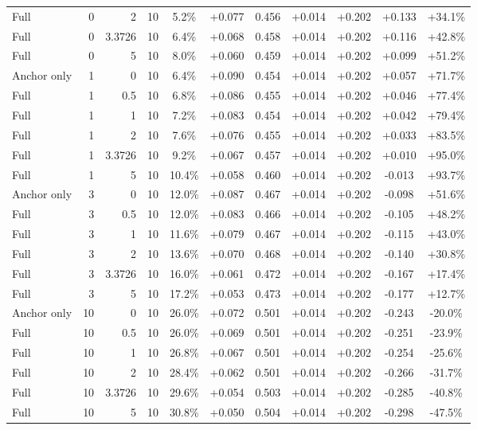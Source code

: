 \begin{table}[htbp]
\begin{tabular}{lrrrccccccc}
Full & 0 & 2 & 10 & 5.2\% & +0.077 & 0.456 & +0.014 & +0.202 & +0.133 & +34.1\% \\
Full & 0 & 3.3726 & 10 & 6.4\% & +0.068 & 0.458 & +0.014 & +0.202 & +0.116 & +42.8\% \\
Full & 0 & 5 & 10 & 8.0\% & +0.060 & 0.459 & +0.014 & +0.202 & +0.099 & +51.2\% \\
Anchor only & 1 & 0 & 10 & 6.4\% & +0.090 & 0.454 & +0.014 & +0.202 & +0.057 & +71.7\% \\
Full & 1 & 0.5 & 10 & 6.8\% & +0.086 & 0.455 & +0.014 & +0.202 & +0.046 & +77.4\% \\
Full & 1 & 1 & 10 & 7.2\% & +0.083 & 0.454 & +0.014 & +0.202 & +0.042 & +79.4\% \\
Full & 1 & 2 & 10 & 7.6\% & +0.076 & 0.455 & +0.014 & +0.202 & +0.033 & +83.5\% \\
Full & 1 & 3.3726 & 10 & 9.2\% & +0.067 & 0.457 & +0.014 & +0.202 & +0.010 & +95.0\% \\
Full & 1 & 5 & 10 & 10.4\% & +0.058 & 0.460 & +0.014 & +0.202 & -0.013 & +93.7\% \\
Anchor only & 3 & 0 & 10 & 12.0\% & +0.087 & 0.467 & +0.014 & +0.202 & -0.098 & +51.6\% \\
Full & 3 & 0.5 & 10 & 12.0\% & +0.083 & 0.466 & +0.014 & +0.202 & -0.105 & +48.2\% \\
Full & 3 & 1 & 10 & 11.6\% & +0.079 & 0.467 & +0.014 & +0.202 & -0.115 & +43.0\% \\
Full & 3 & 2 & 10 & 13.6\% & +0.070 & 0.468 & +0.014 & +0.202 & -0.140 & +30.8\% \\
Full & 3 & 3.3726 & 10 & 16.0\% & +0.061 & 0.472 & +0.014 & +0.202 & -0.167 & +17.4\% \\
Full & 3 & 5 & 10 & 17.2\% & +0.053 & 0.473 & +0.014 & +0.202 & -0.177 & +12.7\% \\
Anchor only & 10 & 0 & 10 & 26.0\% & +0.072 & 0.501 & +0.014 & +0.202 & -0.243 & -20.0\% \\
Full & 10 & 0.5 & 10 & 26.0\% & +0.069 & 0.501 & +0.014 & +0.202 & -0.251 & -23.9\% \\
Full & 10 & 1 & 10 & 26.8\% & +0.067 & 0.501 & +0.014 & +0.202 & -0.254 & -25.6\% \\
Full & 10 & 2 & 10 & 28.4\% & +0.062 & 0.501 & +0.014 & +0.202 & -0.266 & -31.7\% \\
Full & 10 & 3.3726 & 10 & 29.6\% & +0.054 & 0.503 & +0.014 & +0.202 & -0.285 & -40.8\% \\
Full & 10 & 5 & 10 & 30.8\% & +0.050 & 0.504 & +0.014 & +0.202 & -0.298 & -47.5\% \\

\end{tabular}
\end{table}
